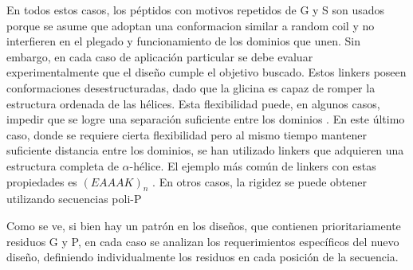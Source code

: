 

En todos estos casos, los péptidos con motivos repetidos de G y S son usados porque se asume que adoptan una conformacion similar a random coil y no interfieren en el plegado y funcionamiento de los dominios que unen. Sin embargo, en cada caso de aplicación particular se debe evaluar experimentalmente que el diseño cumple el objetivo buscado.
Estos linkers poseen conformaciones desestructuradas, dado que la glicina es capaz de romper la estructura ordenada de las hélices. Esta flexibilidad puede, en algunos casos, impedir que se logre una separación 
suficiente entre los dominios \cite{evers2006quantitative}.
En este último caso, donde se requiere cierta flexibilidad pero al mismo tiempo mantener suficiente distancia entre los dominios, se han utilizado linkers que adquieren una estructura completa de $\alpha$-hélice.
El ejemplo más común de linkers con estas propiedades es $(EAAAK)_n$ \cite{arai2001design}. 
En otros casos, la rigidez se puede obtener utilizando secuencias poli-P \cite{schuler2005polyproline}


Como se ve, si bien hay un patrón en los diseños, que contienen prioritariamente residuos G y P, en cada caso se analizan los requerimientos específicos del nuevo diseño, 
definiendo individualmente los residuos en cada posición de la secuencia.


% 







